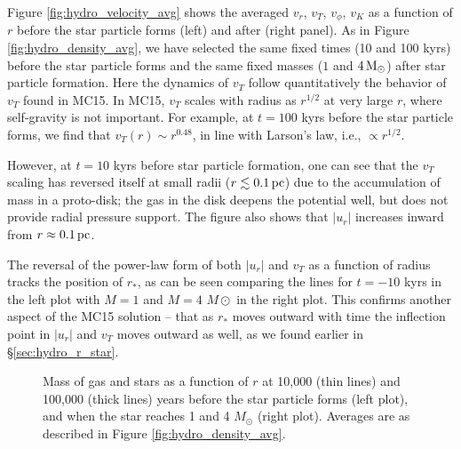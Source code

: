 \documentclass[../dissertation.tex]{subfiles}
\begin{document}
Figure \ref{fig:hydro_velocity_avg} shows the averaged $v_r$, $v_T$,  
$v_{\phi}$, $v_K$ as a function of $r$ before the star particle forms 
(left) and after (right panel).  As in Figure \ref{fig:hydro_density_avg}, 
we have selected the same fixed times (10 and 100 kyrs) before the star 
particle forms and the same fixed masses ($1$ and $4\,{\rm M}_{\odot}$) 
after star particle formation.  Here the dynamics of $v_T$ follow 
quantitatively the behavior of $v_T$ found in MC15. In MC15, $v_T$ 
scales with radius as $r^{1/2}$ at very large $r$, where self-gravity 
is not important. For example, at $t=100$ kyrs before 
the star particle forms, we find that $v_T(r)\sim r^{0.48}$, in line with
Larson's law, i.e., $\propto r^{1/2}$. 


However, at $t=10 $ kyrs before star particle formation, one can see
that the $v_T$ scaling has reversed itself at small 
radii ($r\lesssim0.1\,\rm pc$) due to the accumulation of mass in a 
proto-disk; the gas in the disk deepens the potential well, but does 
not provide radial pressure support. The figure also shows that $|u_r|$ 
increases inward from $r\approx0.1\,\rm pc$.

The reversal of the power-law form of both $|u_r|$ and 
$v_T$ as a function of radius tracks 
the position of $r_*$, as can be seen
comparing the lines for $t=-10$ kyrs in the left
plot with $M=1$ and $M=4$ $M\odot$ in the right plot. This confirms another
aspect of the MC15 solution -- that as $r_*$ moves outward with time the 
inflection point in $|u_r|$ and $v_T$ moves outward as well, as we found
earlier in \S \ref{sec:hydro_r_star}.

\begin{figure*}[htb] %
\caption[Hydro run of Mass]{Mass of gas and stars as a function of $r$ at 10,000 (thin lines) 
and 100,000 (thick lines) years before the star particle forms (left plot), 
and when the star reaches 1 and 4 $M_{\odot}$ (right plot). Averages 
are as described in Figure \ref{fig:hydro_density_avg}. \label{fig:hydro_mass_avg}}
\end{figure*}
\end{document}
